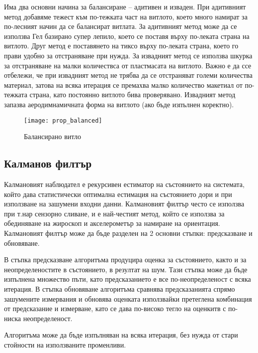 Има два основни начина за балансиране -- адитивен и изваден.
При адитивният метод добавяме тежест към по-тежката част на витлото, което много намират за по-лесният начин да се балансират витлата.
За адитивният метод може да се използва Гел базирано супер лепило, което се поставя върху по-леката страна на витлото.
Друг метод е поставянето на тиксо върху по-леката страна, което го прави удобно за отстраняване при нужда.
За извадният метод се използва шкурка за отстраняване на малки количествса от пластмасата на витлото.
Важно е да ссе отбележи, че при извадният метод не трябва да се отстраняват големи количества материал,
затова на всяка итерация се премахва малко количество макетиал от по-тежката страна, като постоянно витлото бива проверявано.
Извадният метод запазва аеродимнамичната форма на витлото (ако бъде изпълнен коректно).


\begin{figure}[htpb!]
    \centering
    \texttt{[image: prop\_balanced]}
    \caption{Балансирано витло}
    \label{fig:prop_balanced}
\end{figure}




\subsection{Калманов филтър}

Калмановият наблюдател е рекурсивен естиматор на 
състоянието на системата, който дава статистически
оптимална естимация на състоянието дори и при използване на
зашумени входни данни.
Калмановият филтър често се използва при т.нар сензорно сливане,
и е най-честият метод, който се използва 
за обединяване на жироскоп и акселерометър за намиране на ориентация.
Калмановият филтър може да бъде разделен на 2 основни стъпки: предсказване и обновяване.

В стъпка предсказване алгоритъма продуцира оценка за състоянието, както и за неопределеностите в състоянието,
в резултат на шум. Тази стъпка може да бъде изпълнена множество пъти, като предсказанието е все по-неопределеност с всяка итерация.
В стъпка обновяване алгоритъма сравнява предсказанията спрямо зашумените измервания и обновява
оценката използвайки претеглена комбинация 
от предсказание и измерване, като се дава по-високо
тегло на оценкитв с по-ниска неопределеност.

Алгоритъма може да бъде изпълняван на всяка итерация,
без нужда от стари стойности на използваните променливи.

